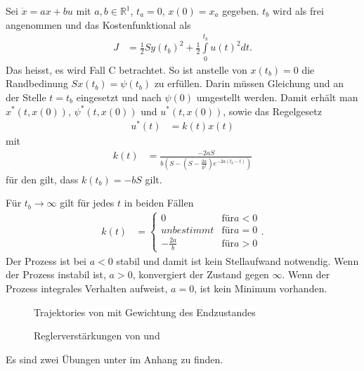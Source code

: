 \begin{exmp}\label{exmp:kap_2_vor_optlsg_2}
Sei $\dot{x}=ax+bu$ mit $a,b\in\mathbb{R}^1$, $t_a=0$, $x(0)=x_a$ gegeben. $t_b$ wird als frei angenommen und das Kostenfunktional als
\begin{align*}
	J & = \frac12 Sy(t_b)^2 + \frac12\int\limits_0^{t_b}u(t)^2dt.
\end{align*}
Das heisst, es wird Fall C betrachtet. So ist anstelle von $x(t_b)=0$ die Randbedinung $Sx(t_b)=\psi(t_b)$ zu erfüllen. Darin müssen Gleichung
 und  an der Stelle $t=t_b$ eingesetzt und nach $\psi(0)$ umgestellt werden. Damit
erhält man $x^{\ast}\left(t,x(0) \right)$, $\psi^{\ast}\left(t,x(0) \right)$ und $u^{\ast}\left(t,x(0) \right)$, sowie das Regelgesetz
\begin{align*}
	u^{\ast}(t) & = k(t) x(t)
\end{align*}
mit
\begin{align*}
	k(t) & = \frac{-2a S}{b\left(S-\left(S-\frac{2a}{b^2} \right)e^{-2a(t_b-t)} \right)}
\end{align*}
für den gilt, dass $k(t_b)=-bS$ gilt.

Für $t_b\rightarrow\infty$ gilt für jedes $t$ in beiden Fällen
\begin{align*}
	k(t) & = \left\{\begin{array}{cl}
	0 & \text{für} a < 0\\
	unbestimmt & \text{für} a = 0\\
	-\frac{2a}{b} & \text{für} a > 0
	\end{array}\right. .
\end{align*}
Der Prozess ist bei $a<0$ stabil und damit ist kein Stellaufwand notwendig. Wenn der Prozess instabil ist, $a > 0$, konvergiert der Zustand gegen
$\infty$. Wenn der Prozess integrales Verhalten aufweist, $a=0$, ist kein Minimum vorhanden.
\end{exmp}
\begin{figure}[htb]
	\centering
	
	\caption{Trajektories von  mit Gewichtung des Endzustandes}
	\label{fig:kap_2_vor_optlsg_exmp_2}
\end{figure}
\begin{figure}[htb]
	\centering
	
	\caption{Reglerverstärkungen von  und }
	\label{fig:kap_2_vor_optlsg_exmp_2_k}
\end{figure}
Es sind zwei Übungen unter  im Anhang zu finden.

